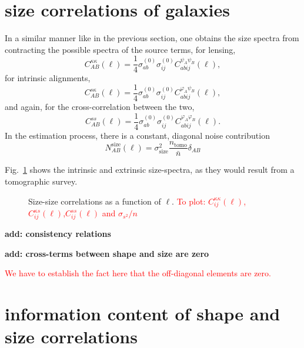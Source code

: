 \documentclass[a4paper,fleqn,usenatbib]{mnras}
\def\spirou#1{{\bf #1}}
\newcommand\BG[1]{\textcolor{red}{#1}}
\begin{document}
\section{size correlations of galaxies}\label{sect_sizes}
In a similar manner like in the previous section, one obtains the size spectra from contracting the possible spectra of the source terms, for lensing,
\begin{equation}
C^{\kappa\kappa}_{AB}(\ell) = \frac{1}{4}\sigma^{(0)}_{ab}\sigma^{(0)}_{ij}C^{\psi_A\psi_B}_{abij}(\ell),
\end{equation}
for intrinsic alignments,
\begin{equation}
C^{s\kappa}_{AB}(\ell) = \frac{1}{4}\sigma^{(0)}_{ab}\sigma^{(0)}_{ij}C^{\varphi_A\psi_B}_{abij}(\ell),
\end{equation}
and again, for the cross-correlation between the two,
\begin{equation}
C^{ss}_{AB}(\ell) = \frac{1}{4}\sigma^{(0)}_{ab}\sigma^{(0)}_{ij}C^{\varphi_A\varphi_B}_{abij}(\ell).
\end{equation}
In the estimation process, there is a constant, diagonal noise contribution
\begin{equation}
N_{AB}^\mathrm{size}(\ell) = \sigma^2_\mathrm{size} \frac{n_\mathrm{tomo}}{\bar{n}}\delta_{AB}
\end{equation}


Fig.~\ref{fig:shapeshape} shows the intrinsic and extrinsic size-spectra, as they would result from a tomographic survey.

\begin{figure}
\centering
\caption{Size-size correlations as a function of $\ell$. \BG{To plot: $C_{ij}^{\kappa\kappa}(\ell)$,$C_{ij}^{\kappa s}(\ell)$,$C_{ij}^{ss}(\ell)$ and $\sigma_{s^2}/n$}}
\label{fig:shapeshape}
\end{figure}


\spirou{add: consistency relations}

\spirou{add: cross-terms between shape and size are zero}

\BG{We have to establish the fact here that the off-diagonal elements are zero.}



\section{information content of shape and size correlations}\label{sect_fisher}
\end{document}

